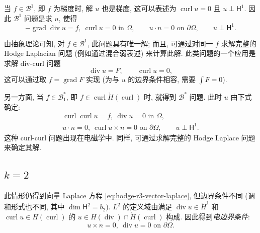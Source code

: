 {当 $f\in\mathcal B^1$, 即 $f$ 为梯度时, 解 $u$ 也是梯度, 这可以表述为 $\operatorname{curl}u=0$ 且 $u\perp\mathsf H^1$. 因此 $\mathcal B^1$ 问题是求 $u$, 使得}
\[
-\operatorname{grad}\operatorname{div}u=f,\ \operatorname{curl}u=0\text{ in }\Omega,\qquad u\cdot n=0\text{ on }\partial\Omega,\qquad u\perp\mathsf H^1.
\]

{由抽象理论可知, 对 $f\in\mathcal B^1$, 此问题具有唯一解; 而且, 可通过对同一 $f$ 求解完整的 Hodge Laplacian 问题 (例如通过混合弱表述) 来计算此解. 此类问题的一个应用是求解 div-curl 问题}
\[
\operatorname{div}u=F,\qquad\operatorname{curl}u=0,
\]
{这可以通过取 $f=\operatorname{grad}F$ 实现 (为与 $u$ 的边界条件相容, 需要 $\int F=0$).}

{另一方面, 当 $f\in\mathcal B_1^*$, 即 $f\in\operatorname{curl}\mathring H(\operatorname{curl})$ 时, 就得到 $\mathcal B^*$ 问题. 此时 $u$ 由下式确定:}
\[
\begin{gathered}
\operatorname{curl}\operatorname{curl}u=f,\ \operatorname{div}u=0\text{ in }\Omega,\\
u\cdot n=0,\ \operatorname{curl}u\times n=0\text{ on }\partial\Omega,\qquad u\perp\mathsf H^1.
\end{gathered}
\]
{这种 curl-curl 问题出现在电磁学中. 同样, 可通过求解完整的 Hodge Laplace 问题来确定其解.}

\subsection{$k=2$}\label{subsec:hodge-r3-k2}

{此情形仍得到向量 Laplace 方程 \eqref{eq:hodge-r3-vector-laplace}, 但边界条件不同 (调和形式也不同, 其中 $\dim\mathsf H^2=b_2$). $L^2$ 的定义域由满足 $\operatorname{div}u\in\mathring H^1$ 和 $\operatorname{curl}u\in H(\operatorname{curl})$ 的 $u\in H(\operatorname{div})\cap\mathring H(\operatorname{curl})$ 构成. 因此得到\emph{电边界条件}:}
\[
u\times n=0,\ \operatorname{div}u=0\text{ on }\partial\Omega.
\]

